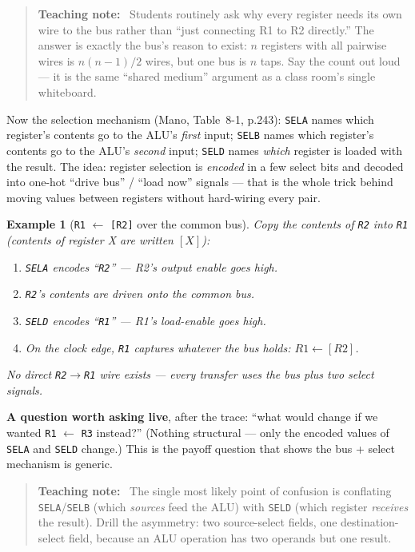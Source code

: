 \documentclass[11pt]{article}
\newtheorem{example}{Example}[section]
\newenvironment{teachingaside}{\begin{quote}\small\color{primary-gold}\textbf{Teaching note:}\ }{\end{quote}}
\begin{document}
\begin{teachingaside}
Students routinely ask why every register needs its own wire to the bus rather than ``just connecting R1 to R2 directly.'' The answer is exactly the bus's reason to exist: $n$ registers with all pairwise wires is $n(n-1)/2$ wires, but one bus is $n$ taps. Say the count out loud --- it is the same ``shared medium'' argument as a class room's single whiteboard.
\end{teachingaside}

Now the selection mechanism (Mano, Table~8-1, p.243): \texttt{SELA} names which register's contents go to the ALU's \emph{first} input; \texttt{SELB} names which register's contents go to the ALU's \emph{second} input; \texttt{SELD} names \emph{which} register is loaded with the result. The idea: register selection is \emph{encoded} in a few select bits and decoded into one-hot ``drive bus'' / ``load now'' signals --- that is the whole trick behind moving values between registers without hard-wiring every pair.

\begin{example}[\texttt{R1} $\gets$ \texttt{[R2]} over the common bus]
Copy the \emph{contents} of \texttt{R2} into \texttt{R1} (contents of register X are written $[X]$):
\begin{enumerate}
  \item \texttt{SELA} encodes ``\texttt{R2}'' --- R2's output enable goes high.
  \item \texttt{R2}'s contents are driven onto the common bus.
  \item \texttt{SELD} encodes ``\texttt{R1}'' --- R1's load-enable goes high.
  \item On the clock edge, \texttt{R1} captures whatever the bus holds: $R1 \gets [R2]$.
\end{enumerate}
No direct \texttt{R2}$\to$\texttt{R1} wire exists --- every transfer uses the bus plus two select signals.
\end{example}

\textbf{A question worth asking live}, after the trace: ``what would change if we wanted \texttt{R1} $\gets$ \texttt{R3} instead?'' (Nothing structural --- only the encoded values of \texttt{SELA} and \texttt{SELD} change.) This is the payoff question that shows the bus + select mechanism is generic.

\begin{teachingaside}
The single most likely point of confusion is conflating \texttt{SELA}/\texttt{SELB} (which \emph{sources} feed the ALU) with \texttt{SELD} (which register \emph{receives} the result). Drill the asymmetry: two source-select fields, one destination-select field, because an ALU operation has two operands but one result.
\end{teachingaside}
\end{document}
